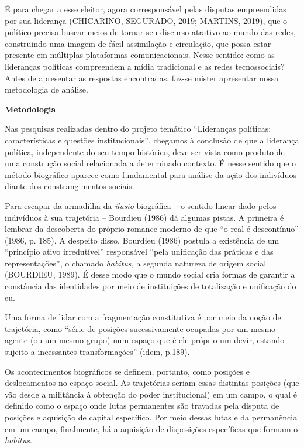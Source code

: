 É para chegar a esse eleitor, agora corresponsável pelas disputas
empreendidas por sua liderança (CHICARINO, SEGURADO, 2019; MARTINS,
2019), que o político precisa buscar meios de tornar seu discurso
atrativo ao mundo das redes, construindo uma imagem de fácil assimilação
e circulação, que possa estar presente em múltiplas plataformas
comunicacionais. Nesse sentido: como as lideranças políticas compreendem
a mídia tradicional e as redes tecnossociais? Antes de apresentar as
respostas encontradas, faz-se mister apresentar nossa metodologia de
análise.

\textbf{Metodologia}

Nas pesquisas realizadas dentro do projeto temático ``Lideranças
políticas: características e questões institucionais'', chegamos à
conclusão de que a liderança política, independente do seu tempo
histórico, deve ser vista como produto de uma construção social
relacionada a determinado contexto. É nesse sentido que o método
biográfico aparece como fundamental para análise da ação dos indivíduos
diante dos constrangimentos sociais.

Para escapar da armadilha da \emph{ilusio} biográfica -- o sentido
linear dado pelos indivíduos à sua trajetória -- Bourdieu (1986) dá
algumas pistas. A primeira é lembrar da descoberta do próprio romance
moderno de que ``o real é descontínuo'' (1986, p. 185). A despeito
disso, Bourdieu (1986) postula a existência de um ``princípio ativo
irredutível'' responsável ``pela unificação das práticas e das
representações'', o chamado \emph{habitus,} a segunda natureza de origem
social (BOURDIEU, 1989). É desse modo que o mundo social cria formas de
garantir a constância das identidades por meio de instituições de
totalização e unificação do eu.

Uma forma de lidar com a fragmentação constitutiva é por meio da noção
de trajetória, como ``série de posições sucessivamente ocupadas por um
mesmo agente (ou um mesmo grupo) num espaço que é ele próprio um devir,
estando sujeito a incessantes transformações'' (idem, p.189).

Os acontecimentos biográficos se definem, portanto, como posições e
deslocamentos no espaço social. As trajetórias seriam essas distintas
posições (que vão desde a militância à obtenção do poder institucional)
em um campo, o qual é definido como o espaço onde lutas permanentes são
travadas pela disputa de posições e aquisição de capital específico. Por
meio dessas lutas e da permanência em um campo, finalmente, há a
aquisição de disposições específicas que formam o \emph{habitus}.

